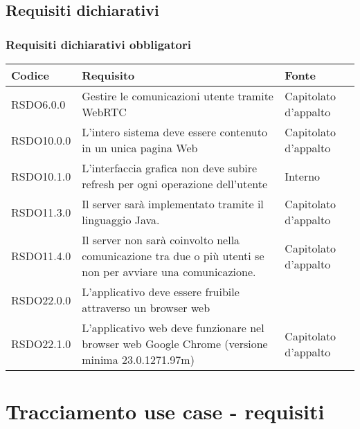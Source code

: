 \subsection{Requisiti dichiarativi}

\subsubsection{Requisiti dichiarativi obbligatori}

\begin{center}
\begin{longtable}{lp{}l}
\toprule Codice & Requisito & Fonte\\
\midrule
RSDO6.0.0 & Gestire le comunicazioni utente tramite WebRTC & Capitolato d'appalto \\
RSDO10.0.0 & L'intero sistema deve essere contenuto in un unica pagina Web & Capitolato d'appalto \\
RSDO10.1.0 & L'interfaccia grafica non deve subire refresh per ogni operazione dell'utente & Interno \\
RSDO11.3.0 & Il server sarà implementato tramite il linguaggio Java. & Capitolato d'appalto \\
RSDO11.4.0 & Il server non sarà coinvolto nella comunicazione tra due o più utenti se non per avviare una comunicazione. & Capitolato d'appalto \\
RSDO22.0.0 & L'applicativo deve essere fruibile attraverso un browser web &  \\
RSDO22.1.0 & L'applicativo web deve funzionare nel browser web Google Chrome (versione minima 23.0.1271.97m) & Capitolato d'appalto \\
\bottomrule
\end{longtable}
\end{center}

\newpage\section{Tracciamento use case - requisiti}\label{sec:tracciamento}

